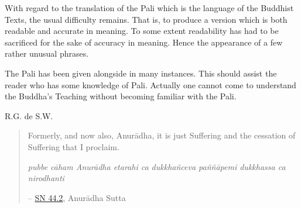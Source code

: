 With regard to the translation of the Pali which is the language of the Buddhist Texts, the usual difficulty remains. That is, to produce a version which is both readable and accurate in meaning. To some extent readability has had to be sacrificed for the sake of accuracy in meaning. Hence the appearance of a few rather unusual phrases.

The Pali has been given alongside in many instances. This should assist the reader who has some knowledge of Pali. Actually one cannot come to understand the Buddha's Teaching without becoming familiar with the Pali.

R.G. de S.W.

\begin{quote}
Formerly, and now also, Anurādha, it is just Suffering and the cessation of Suffering that I proclaim.

\textit{pubbe cāham Anurādha etarahi ca dukkhañceva paññāpemi dukkhassa ca nirodhanti}

 -- \href{https://suttacentral.net/sn44.2/en/sujato}{SN 44.2}, Anurādha Sutta
\end{quote}

